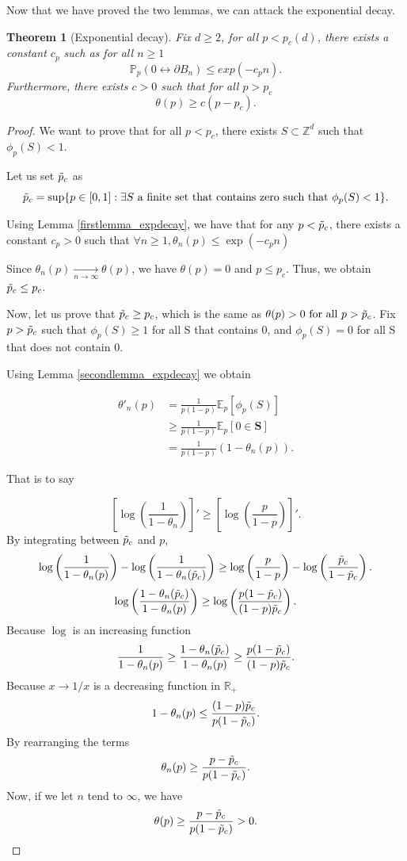 \documentclass[a4paper,11pt]{article}
\theoremstyle{plain}
\newtheorem{theorem}{Theorem}[section]
\theoremstyle{definition}
\theoremstyle{remark}
\begin{document}
Now that we have proved the two lemmas, we can attack the exponential decay.
\begin{theorem}[Exponential decay]
\label{exponentialdecay}
  Fix $d \geq 2$, for all $p < p_c(d)$, there exists a constant $c_p$ such as for all $n \geq 1$
  \[ \mathbb{P}_p(0 \longleftrightarrow \partial B_n) \leq exp(-c_p n). \]
  Furthermore, there exists $c > 0$ such that for all $p > p_c$
  \[\theta(p) \geq c(p - p_c).\]
\end{theorem}

\begin{proof}
We want to prove that for all $p < p_c$, there exists $S \subset \mathbb{Z}^d$ such that $\phi_p(S) < 1$.

Let us set $\Tilde{p}_c$ as
\[ \Tilde{p}_c = \sup\{p \in [0,1] : \exists S \text{ a finite set that contains zero such that } \phi_p(S) < 1\}. \]

Using Lemma \ref{firstlemma_expdecay}, we have that for any $p < \Tilde{p}_c$, there exists a constant $c_p > 0$ such that $\forall n \geq 1, \theta_n(p) \leq \exp(-c_p n)$

Since $\theta_n(p) \xrightarrow[n \rightarrow \infty]{} \theta(p)$, we have $\theta(p) = 0$ and $p \leq p_c$. Thus, we obtain $\Tilde{p}_c \leq p_c$.

Now, let us prove that $\Tilde{p}_c \geq p_c$, which is the same as $\theta(p) > 0 \text{ for all } p > \Tilde{p}_c$. Fix $p > \Tilde{p}_c$ such that $\phi_p(S) \geq 1$ for all S that contains $0$, and $\phi_p(S) = 0$ for all S that does not contain $0$.

Using Lemma \ref{secondlemma_expdecay} we obtain

\begin{align*}
    \theta'_n(p) &= \frac{1}{p(1-p)}\mathbb{E}_p[\phi_p(S)] \\
    &\geq  \frac{1}{p(1-p)}\mathbb{E}_p[0 \in \mathbf{S}] \\
    &= \frac{1}{p(1-p)}(1-\theta_n(p)).
\end{align*}

That is to say  

\[ \left[\log\left(\frac{1}{1-\theta_n}\right)\right]' \geq \left[\log\left(\frac{p}{1-p}\right)\right]'.\]
By integrating between $\Tilde{p}_c$ and $p$,
\[ \log\left(\frac{1}{1 - \theta_n(p)}\right) - \log\left(\frac{1}{1 - \theta_n(\Tilde{p}_c)}\right) \geq \log\left(\frac{p}{1-p}\right) -\log\left(\frac{\Tilde{p}_c}{1-\Tilde{p}_c}\right). \]
\[ \log\left(\frac{1 - \theta_n(\Tilde{p}_c)}{1 - \theta_n(p)}\right) \geq \log\left(\frac{p(1 - \Tilde{p}_c)}{(1-p)\Tilde{p}_c}\right). \]
Because $\log$ is an increasing function
\[ \frac{1}{1 - \theta_n(p)} \geq \frac{1 - \theta_n(\Tilde{p}_c)}{1 - \theta_n(p)} \geq \frac{p(1 - \Tilde{p}_c)}{(1-p)\Tilde{p}_c}. \]
Because $x \longrightarrow 1/x$ is a decreasing function in $\mathbb{R}_+$
\[ 1 - \theta_n(p) \leq \frac{(1-p)\Tilde{p}_c}{p(1 - \Tilde{p}_c)}. \]
By rearranging  the terms
\[ \theta_n(p) \geq \frac{p - \Tilde{p}_c}{p(1 - \Tilde{p}_c)}. \]
Now, if we let $n$ tend to $\infty$, we have
\[ \theta(p) \geq \frac{p - \Tilde{p}_c}{p(1 - \Tilde{p}_c)} > 0. \]


\end{proof}
\end{document}
